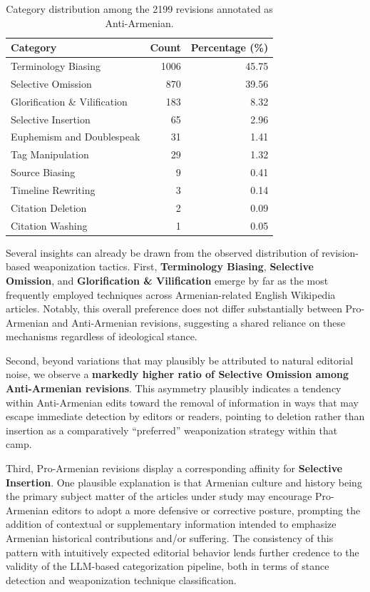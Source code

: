 \documentclass[11pt, a4paper, twoside, openright]{article} %
\begin{document}
\begin{table}[h!]
\centering
\begin{tabular}{@{}lrr@{}}  %
\toprule
\textbf{Category} & \textbf{Count} & \textbf{Percentage (\%)} \\
\midrule
Terminology Biasing & 1006 & 45.75 \\
Selective Omission & 870 & 39.56 \\
Glorification \& Vilification & 183 & 8.32 \\
Selective Insertion & 65 & 2.96 \\
Euphemism and Doublespeak & 31 & 1.41 \\
Tag Manipulation & 29 & 1.32 \\
Source Biasing & 9 & 0.41 \\
Timeline Rewriting & 3 & 0.14 \\
Citation Deletion & 2 & 0.09 \\
Citation Washing & 1 & 0.05 \\
\bottomrule
\end{tabular}
\caption{Category distribution among the 2199 revisions annotated as Anti-Armenian.}
\label{tab:ref-anti}
\end{table}


Several insights can already be drawn from the observed distribution of revision-based weaponization tactics. First, \textbf{Terminology Biasing}, \textbf{Selective Omission}, and \textbf{Glorification \& Vilification} emerge by far as the most frequently employed techniques across Armenian-related English Wikipedia articles. Notably, this overall preference does not differ substantially between Pro-Armenian and Anti-Armenian revisions, suggesting a shared reliance on these mechanisms regardless of ideological stance.

Second, beyond variations that may plausibly be attributed to natural editorial noise, we observe a \textbf{markedly higher ratio of Selective Omission among Anti-Armenian revisions}. This asymmetry plausibly indicates a tendency within Anti-Armenian edits toward the removal of information in ways that may escape immediate detection by editors or readers, pointing to deletion rather than insertion as a comparatively “preferred” weaponization strategy within that camp.

Third, Pro-Armenian revisions display a corresponding affinity for \textbf{Selective Insertion}. One plausible explanation is that Armenian culture and history being the primary subject matter of the articles under study may encourage Pro-Armenian editors to adopt a more defensive or corrective posture, prompting the addition of contextual or supplementary information intended to emphasize Armenian historical contributions and/or suffering. The consistency of this pattern with intuitively expected editorial behavior lends further credence to the validity of the LLM-based categorization pipeline, both in terms of stance detection and weaponization technique classification.
\end{document}
